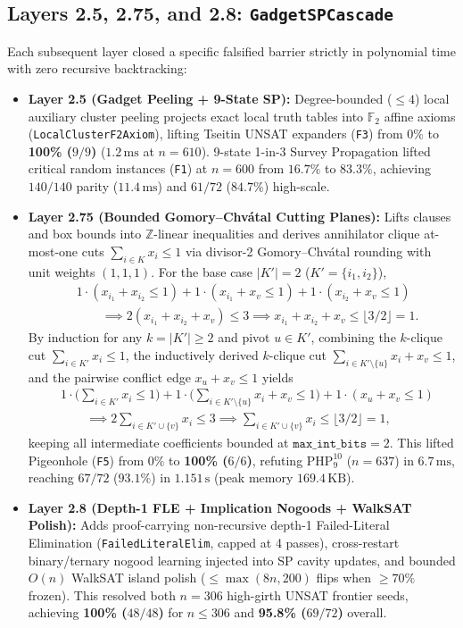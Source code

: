 \documentclass[11pt]{article}
\begin{document}
\subsection{Layers 2.5, 2.75, and 2.8: \texttt{GadgetSPCascade}}
Each subsequent layer closed a specific falsified barrier strictly in polynomial time with zero recursive backtracking:
\begin{itemize}
  \item \textbf{Layer 2.5 (Gadget Peeling + 9-State SP):} Degree-bounded ($\le 4$) local auxiliary cluster peeling projects exact local truth tables into $\mathbb{F}_2$ affine axioms (\texttt{LocalClusterF2Axiom}), lifting Tseitin UNSAT expanders (\texttt{F3}) from $0\%$ to \textbf{100\% ($9/9$)} ($1.2\,\text{ms}$ at $n = 610$). 9-state 1-in-3 Survey Propagation lifted critical random instances (\texttt{F1}) at $n=600$ from $16.7\%$ to $83.3\%$, achieving $140/140$ parity ($11.4\,\text{ms}$) and $61/72$ ($84.7\%$) high-scale.
  \item \textbf{Layer 2.75 (Bounded Gomory--Chv\'atal Cutting Planes):} Lifts clauses and box bounds into $\mathbb{Z}$-linear inequalities and derives annihilator clique at-most-one cuts $\sum_{i \in K} x_i \le 1$ via divisor-2 Gomory--Chv\'atal rounding with unit weights $(1, 1, 1)$. For the base case $|K'| = 2$ ($K' = \{i_1, i_2\}$),
  \begin{align*}
  &1 \cdot (x_{i_1} + x_{i_2} \le 1) + 1 \cdot (x_{i_1} + x_v \le 1) + 1 \cdot (x_{i_2} + x_v \le 1) \\
  &\qquad \implies 2(x_{i_1} + x_{i_2} + x_v) \le 3 \implies x_{i_1} + x_{i_2} + x_v \le \lfloor 3/2 \rfloor = 1.
  \end{align*}
  By induction for any $k = |K'| \ge 2$ and pivot $u \in K'$, combining the $k$-clique cut $\sum_{i \in K'} x_i \le 1$, the inductively derived $k$-clique cut $\sum_{i \in K' \setminus \{u\}} x_i + x_v \le 1$, and the pairwise conflict edge $x_u + x_v \le 1$ yields
  \begin{align*}
  &1 \cdot \Big(\sum_{i \in K'} x_i \le 1\Big) + 1 \cdot \Big(\sum_{i \in K' \setminus \{u\}} x_i + x_v \le 1\Big) + 1 \cdot (x_u + x_v \le 1) \\
  &\qquad \implies 2 \sum_{i \in K' \cup \{v\}} x_i \le 3 \implies \sum_{i \in K' \cup \{v\}} x_i \le \lfloor 3/2 \rfloor = 1,
  \end{align*}
  keeping all intermediate coefficients bounded at $\texttt{max\_int\_bits} = 2$. This lifted Pigeonhole (\texttt{F5}) from $0\%$ to \textbf{100\% ($6/6$)}, refuting $\mathrm{PHP}_9^{10}$ ($n = 637$) in $6.7\,\text{ms}$, reaching $67/72$ ($93.1\%$) in $1.151\,\text{s}$ (peak memory $169.4\,\text{KB}$).
  \item \textbf{Layer 2.8 (Depth-1 FLE + Implication Nogoods + WalkSAT Polish):} Adds proof-carrying non-recursive depth-1 Failed-Literal Elimination (\texttt{FailedLiteralElim}, capped at 4 passes), cross-restart binary/ternary nogood learning injected into SP cavity updates, and bounded $O(n)$ WalkSAT island polish ($\le \max(8n, 200)$ flips when $\ge 70\%$ frozen). This resolved both $n=306$ high-girth UNSAT frontier seeds, achieving \textbf{100\% ($48/48$)} for $n \le 306$ and \textbf{95.8\% ($69/72$)} overall.
\end{itemize}
\end{document}
